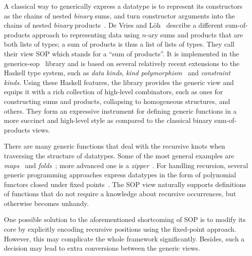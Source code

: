 \documentclass[runningheads]{llncs}
\begin{document}
A classical way to generically express a datatype is to represent its constructors as the chains of nested \emph{binary} sums, and turn constructor arguments into the chains of nested \emph{binary} products~\cite{VanNoort2008,Cheney2002,Loeh2004}\nocite{Rodriguez2008}\nocite{Magalhaes2012}. De Vries and L\"{o}h~\cite{VriLoeh2014} describe a different sum-of-products approach to representing data using $n$-ary sums and products that are both lists of types; a sum of products is thus a list of lists of types. They call their view SOP which stands for a ``sum of products''. It is implemented in the \textsf{generics-sop}~\cite{generics-sop} library and is based on several relatively recent extensions to the Haskell type system, such as \emph{data kinds}, \emph{kind polymorphism}~\cite{Yorgey2012} and \emph{constraint kinds}.
Using these Haskell features, the library provides the generic view and equips it with a rich collection of high-level combinators, such as ones for constructing sums and products, collapsing to homogeneous structures, and others. They form an expressive instrument for defining generic functions in a more succinct and high-level style as compared to the classical binary sum-of-products views.

There are many generic functions that deal with the recursive knots when traversing the structure of datatypes. Some of the most general examples are \emph{maps}~\cite{Magalhaes2010} and \emph{folds}~\cite{Meijer1991}; more advanced one is a \emph{zipper}~\cite{Huet1997,HiJeLo2004,Adams2010}. For handling recursion, several generic programming approaches express datatypes in the form of polynomial functors closed under fixed points~\cite{MuRec2009,Jansson1997,Loeh2011}. The SOP view naturally supports definitions of functions that do not require a knowledge about recursive occurrences, but otherwise becomes unhandy.

One possible solution to the aforementioned shortcoming of SOP is to modify its core by explicitly encoding recursive positions using the fixed-point approach. However, this may complicate the whole framework significantly. Besides, such a decision may lead to extra conversions between the generic views.
\end{document}
